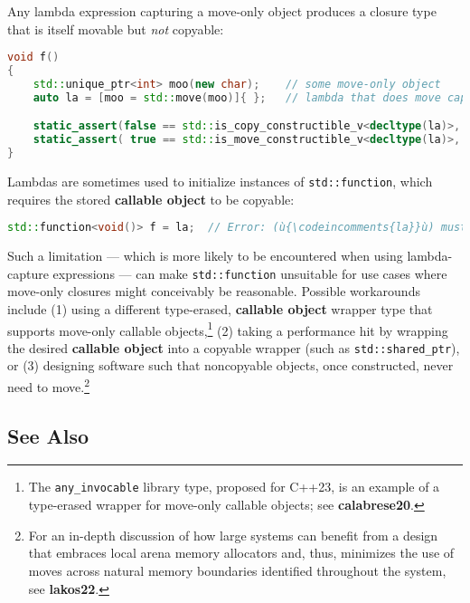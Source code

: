 Any lambda expression capturing a move-only object produces a closure
type that is itself movable but \emph{not} copyable:

\begin{lstlisting}[language=C++]
void f()
{
    std::unique_ptr<int> moo(new char);    // some move-only object
    auto la = [moo = std::move(moo)]{ };   // lambda that does move capture

    static_assert(false == std::is_copy_constructible_v<decltype(la)>, "");
    static_assert( true == std::is_move_constructible_v<decltype(la)>, "");
}
\end{lstlisting}

\noindent Lambdas are sometimes used to initialize instances of
\texttt{std::function}, which requires the stored \textbf{callable
object} to be copyable:

\begin{lstlisting}[language=C++]
std::function<void()> f = la;  // Error: (ù{\codeincomments{la}}ù) must be copyable.
\end{lstlisting}

\noindent Such a limitation --- which is more likely to be encountered when using
lambda-capture expressions --- can make \texttt{std::function}
unsuitable for use cases where move-only closures might conceivably be
reasonable. Possible workarounds include (1) using a different
type-erased, \textbf{callable object} wrapper type that supports
move-only callable objects,{\cprotect\footnote{The
\texttt{any\_invocable} library type, proposed for C++23, is an
example of a type-erased wrapper for move-only callable objects; see
  \textbf{calabrese20}.}} (2) taking a performance hit by wrapping the
desired \textbf{callable object} into a copyable wrapper (such as
\texttt{std::shared\_ptr}), or (3) designing software such that
noncopyable objects, once constructed, never need to
move.\footnote{For an in-depth discussion of how large systems can
benefit from a design that embraces local arena memory allocators and,
thus, minimizes the use of moves across natural memory boundaries
identified throughout the system, see \textbf{lakos22}.}

\subsection[See Also]{See Also}\label{see-also}

